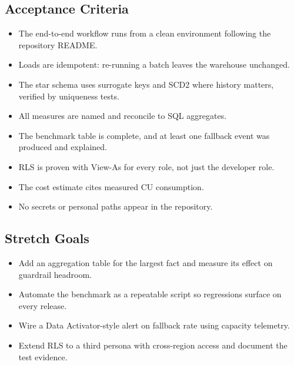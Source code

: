 \subsection*{Acceptance Criteria}
\begin{itemize}
    \item[\(\square\)] The end-to-end workflow runs from a clean environment following the repository README.
    \item[\(\square\)] Loads are idempotent: re-running a batch leaves the warehouse unchanged.
    \item[\(\square\)] The star schema uses surrogate keys and SCD2 where history matters, verified by uniqueness tests.
    \item[\(\square\)] All measures are named and reconcile to SQL aggregates.
    \item[\(\square\)] The benchmark table is complete, and at least one fallback event was produced and explained.
    \item[\(\square\)] RLS is proven with View-As for every role, not just the developer role.
    \item[\(\square\)] The cost estimate cites measured CU consumption.
    \item[\(\square\)] No secrets or personal paths appear in the repository.
\end{itemize}

\subsection*{Stretch Goals}
\begin{itemize}
    \item Add an aggregation table for the largest fact and measure its effect on guardrail headroom.
    \item Automate the benchmark as a repeatable script so regressions surface on every release.
    \item Wire a Data Activator-style alert on fallback rate using capacity telemetry.
    \item Extend RLS to a third persona with cross-region access and document the test evidence.
\end{itemize}
